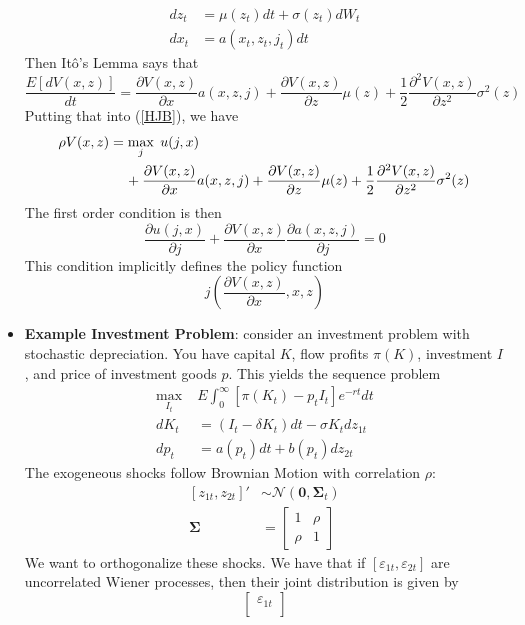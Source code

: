 \documentclass[12pt]{article}
\begin{document}
\begin{itemize}
\[\begin{split}
        dz_t &= \mu(z_t) dt + \sigma(z_t) dW_t \\
        dx_t &= a(x_t, z_t, j_t)dt
    \end{split}\]
    Then Itô's Lemma says that
    \[\frac{E[dV(x,z)]}{dt} = \frac{\partial V(x,z)}{\partial x}a(x,z,j) + \frac{\partial V(x,z)}{\partial z}\mu(z) + \frac{1}{2}\frac{\partial^2V(x,z)}{\partial z^2}\sigma^2(z)\]
    Putting that into (\ref{HJB}), we have
    \[\begin{split}
        \rho V(x,z) &= \max_j\; u(j,x) \\
        &\hspace{4mm}+\frac{\partial V(x,z)}{\partial x}a(x,z,j) + \frac{\partial V(x,z)}{\partial z}\mu(z) + \frac{1}{2}\frac{\partial^2V(x,z)}{\partial z^2}\sigma^2(z)
    \end{split}\]
    The first order condition is then
    \[\frac{\partial u(j,x)}{\partial j} + \frac{\partial V(x,z)}{\partial x}\frac{\partial a(x,z,j)}{\partial j} = 0\]
    This condition implicitly defines the policy function
    \[j\left(\frac{\partial V(x,z)}{\partial x}, x, z\right)\]
    \item \textbf{Example Investment Problem}: consider an investment problem with stochastic depreciation. You have capital $K$, flow profits $\pi(K)$, investment $I$, and price of investment goods $p$. This yields the sequence problem
    \[\begin{split}
        \max_{I_t}\; &E\int_0^{\infty}\left[\pi(K_t) - p_tI_t\right]e^{-rt}dt \\
        dK_t &= (I_t - \delta K_t)dt - \sigma K_tdz_{1t} \\
        dp_t &= a(p_t)dt + b(p_t)dz_{2t}
    \end{split}\]
    The exogeneous shocks follow Brownian Motion with correlation $\rho$:
    \[\begin{split}
        [z_{1t},z_{2t}]' &\sim \mathcal{N}(\textbf{0}, \boldsymbol{\Sigma}_t) \\
        \boldsymbol{\Sigma} &= \begin{bmatrix}
        1 & \rho \\
        \rho & 1 
        \end{bmatrix}
    \end{split}\]
    We want to orthogonalize these shocks. We have that if $[\varepsilon_{1t}, \varepsilon_{2t}]$ are uncorrelated Wiener processes, then their joint distribution is given by
    \[\begin{bmatrix}
    \varepsilon_{1t} \\

\end{bmatrix}\]
\end{itemize}
\end{document}

